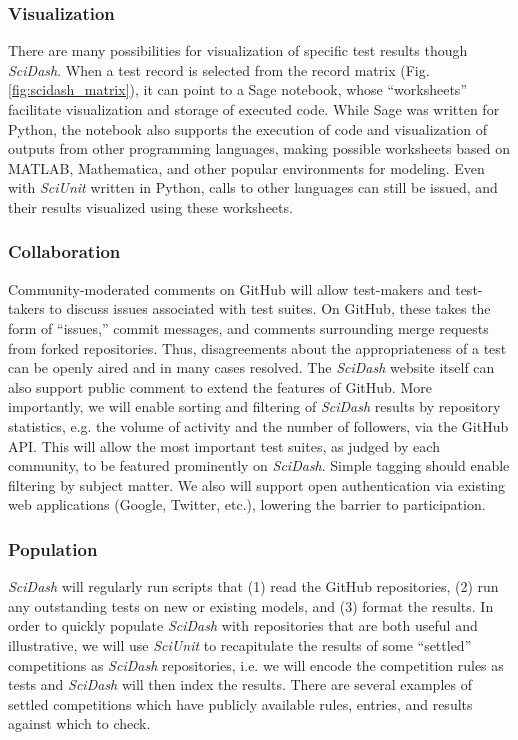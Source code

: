 \documentclass[11pt,letterpaper]{article}
\begin{document}
\subsubsection{Visualization}
\label{sec:scidash_visualization}
There are many possibilities for visualization of specific test results though \textit{SciDash}. 
When a test record is selected from the record matrix (Fig. \ref{fig:scidash_matrix}), it can point to a Sage notebook\cite{sagenb_url}, whose ``worksheets'' facilitate visualization and storage of executed code. 
While Sage was written for Python, the notebook also supports the execution of code and visualization of outputs from other programming languages, making possible worksheets based on MATLAB, Mathematica, and other popular environments for modeling. 
Even with \textit{SciUnit} written in Python, calls to other languages can still be issued, and their results visualized using these worksheets.

\subsubsection{Collaboration}
Community-moderated comments on GitHub will allow test-makers and test-takers to discuss issues associated with test suites. 
On GitHub, these takes the form of ``issues,'' commit messages, and comments surrounding merge requests from forked repositories. 
Thus, disagreements about the appropriateness of a test can be openly aired and in many cases resolved. 
The \textit{SciDash} website itself can also support public comment to extend the features of GitHub. 
More importantly, we will enable sorting and filtering of \textit{SciDash} results by repository statistics, e.g. the volume of activity and the number of followers, via the GitHub API. 
This will allow the most important test suites, as judged by each community, to be featured prominently on \textit{SciDash}. 
Simple tagging should enable filtering by subject matter. 
We also will support open authentication via existing web applications (Google, Twitter, etc.), lowering the barrier to participation.  

\subsubsection{Population}
\textit{SciDash} will regularly run scripts that (1) read the GitHub repositories, (2) run any outstanding tests on new or existing models, and (3) format the results. 
In order to quickly populate \textit{SciDash} with repositories that are both useful and illustrative, we will use \textit{SciUnit} to recapitulate the results of some ``settled'' competitions as \textit{SciDash} repositories, i.e. we will encode the competition rules as tests and \textit{SciDash} will then index the results. 
There are several examples of settled competitions which have publicly available rules, entries, and results against which to check\cite{jolivet_quantitative_2008,hopfield_what_2000,neural_prediction_url}.  
\end{document}
